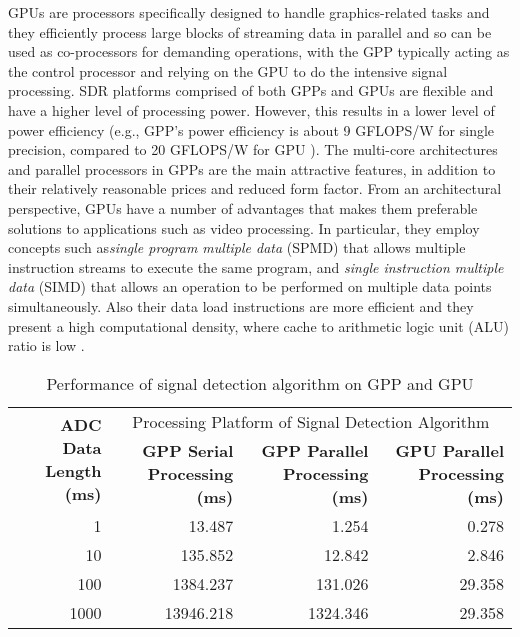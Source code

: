 GPUs are processors specifically designed to handle graphics-related tasks and they efficiently process large blocks of streaming data in parallel and so can be used as co-processors for demanding operations, with the GPP typically acting as the control processor and relying on the GPU to do the intensive signal processing. SDR platforms comprised of both GPPs and GPUs are flexible and have a higher level of processing power. However, this results in a lower level of power efficiency (e.g., GPP's power efficiency is about 9 GFLOPS/W for single precision, compared to 20 GFLOPS/W for GPU \cite{v2014a}). The multi-core architectures and parallel processors in GPPs are the main attractive features, in addition to their relatively reasonable prices and reduced form factor. From an architectural perspective, GPUs have a number of advantages that makes them preferable solutions to applications such as video processing. In particular, they employ concepts such as\emph{single program multiple data} (SPMD) that allows multiple instruction streams to execute the same program, and \emph{single instruction multiple data} (SIMD) that allows an operation to be performed on multiple data points simultaneously.  Also their data load instructions are more efficient and they present a high computational density, where cache to arithmetic logic unit (ALU) ratio is low \cite{cope2010a}.

\begin{table}[ht]
  \caption{Performance of signal detection algorithm on GPP and GPU \cite{fi2017a}}
  \label{table:gpp_gpu_comparison}
  \centering
  \begin{adjustbox}{width=1\textwidth}
  \begin{tabular}{r|r|r|r}
    \toprule
    \multirow{2}{*}{\textbf{ADC Data Length (ms)}} & \multicolumn{3}{c}{Processing Platform of Signal Detection Algorithm} \\
    \multirow{2}{*}{} & \textbf{GPP Serial Processing (ms)} & \textbf{GPP Parallel Processing (ms)} & \textbf{GPU Parallel Processing (ms)} \\
    \midrule
    1    & 13.487    & 1.254    & 0.278 \\
    10   & 135.852   & 12.842   & 2.846 \\
    100  & 1384.237  & 131.026  & 29.358 \\
    1000 & 13946.218 & 1324.346 & 29.358 \\
    \bottomrule
  \end{tabular}
  \end{adjustbox}
\end{table}

